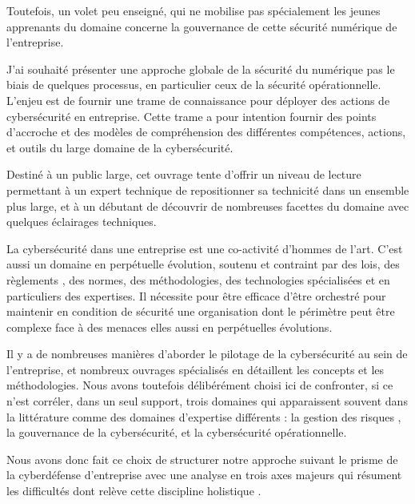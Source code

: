 Toutefois, un volet peu enseigné, qui ne mobilise pas spécialement les jeunes apprenants du domaine concerne la gouvernance de cette sécurité numérique de l'entreprise.

J'ai souhaité présenter une approche globale de la sécurité du numérique pas le biais de quelques processus, en particulier ceux de la sécurité opérationnelle. L'enjeu est de fournir une trame de connaissance pour déployer des actions de cybersécurité en entreprise.
Cette trame a pour intention fournir des points d'accroche et des modèles de compréhension des différentes compétences, actions, et outils du large domaine de la cybersécurité.

Destiné à un public large, cet ouvrage tente d'offrir un niveau de lecture permettant à un expert technique de repositionner sa technicité dans un ensemble plus large, et  à un débutant de découvrir de nombreuses facettes du domaine avec quelques éclairages techniques.

La cybersécurité dans une entreprise est une co-activité d'hommes de l'art.  C'est aussi un domaine en perpétuelle évolution, soutenu et contraint par des lois, des règlements , des normes, des méthodologies,  des technologies spécialisées et en particuliers des expertises.  Il nécessite pour être efficace d'être orchestré pour maintenir en condition de sécurité une organisation dont le périmètre peut être complexe face à des menaces elles aussi en perpétuelles évolutions.

Il y a de nombreuses manières d’aborder le pilotage de la cybersécurité au sein de l’entreprise, et nombreux ouvrages spécialisés en détaillent les concepts et les méthodologies. Nous avons toutefois délibérément choisi ici de confronter, si ce n'est corréler, dans un seul support, trois domaines qui apparaissent souvent dans la littérature comme des domaines d'expertise différents : la gestion des risques , la gouvernance de la cybersécurité, et la cybersécurité opérationnelle. 

Nous avons donc fait ce choix de structurer notre approche suivant le prisme de la cyberdéfense d'entreprise avec une analyse en trois axes majeurs qui résument les difficultés dont relève cette discipline holistique \cite{sch13}. 




